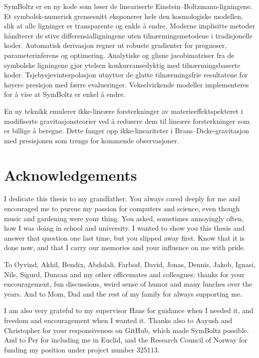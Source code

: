 \documentclass[USenglish, thumbmarks]{uiophdthesis} %
\newcommand\EB{Einstein--Boltzmann}
\newcommand\BD{Brans--Dicke}
\begin{document}
SymBoltz er en ny kode som løser de lineariserte \EB{}-ligningene.
Et symbolsk-numerisk grensesnitt eksponerer hele den kosmologiske modellen, slik at alle ligninger er transparente og enkle å endre.
Moderne implisitte metoder håndterer de stive differensialligningene uten tilnærmingsmetodene i tradisjonelle koder.
Automatisk derivasjon regner ut robuste gradienter for prognoser, parameterinferens og optimering.
Analytiske og glisne jacobimatriser fra de symbolske ligningene
gjør ytelsen konkurransedyktig med tilnærmingsbaserte koder.
Tsjebysjevinterpolasjon utnytter de glatte tilnærmingsfrie resultatene
for høyere presisjon med færre evalueringer.
Vekselvirkende modeller implementeres for å vise at SymBoltz er enkel å endre.

En ny teknikk emulerer ikke-lineære forsterkninger av materieeffektspekteret i modifiserte gravitasjonsteorier
ved å redusere dem til lineære forsterkninger som er billige å beregne.
Dette fanger opp ikke-lineariteter i \BD{}-gravitasjon med presisjonen som trengs for kommende observasjoner.

\chapter*{Acknowledgements}

I dedicate this thesis to my grandfather.
You always cared deeply for me and encouraged me to pursue my passion for computers and science,
even though music and gardening were your thing.
You asked, sometimes annoyingly often, how I was doing in school and university.
I wanted to show you this thesis and answer that question one last time,
but you slipped away first.
Know that it is done now, and that I carry our memories and your influence on me with pride.

To Øyvind, Akhil, Bendix, Abdolali, Farbod, David, Jonas, Dennis, Jakob, Ignasi, Nils, Sigurd, Duncan
and my other officemates and colleagues:
thanks for your encouragement, fun discussions, weird sense of humor and many lunches over the years.
And to Mom, Dad and the rest of my family for always supporting me.

I am also very grateful to my supervisor Hans
for guidance when I needed it,
and freedom and encouragement when I wanted it.
Thanks also to Aayush and Christopher
for your responsiveness on GitHub,
which made SymBoltz possible.
And to Per for including me in Euclid,
and the Research Council of Norway for funding my position under project number 325113.
\end{document}
